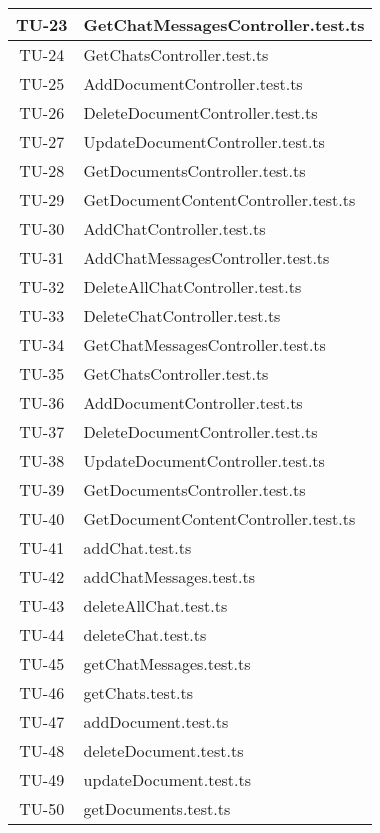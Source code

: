 \begin{xltabular}{0.7\textwidth}{| c | X |}
    TU-23 & GetChatMessagesController.test.ts \\
    \hline
    TU-24 & GetChatsController.test.ts \\
    \hline
    TU-25 & AddDocumentController.test.ts \\
    \hline
    TU-26 & DeleteDocumentController.test.ts \\
    \hline
    TU-27 & UpdateDocumentController.test.ts \\
    \hline
    TU-28 & GetDocumentsController.test.ts \\
    \hline
    TU-29 & GetDocumentContentController.test.ts \\
    \hline
    TU-30 & AddChatController.test.ts \\
    \hline
    TU-31 & AddChatMessagesController.test.ts \\
    \hline
    TU-32 & DeleteAllChatController.test.ts \\
    \hline
    TU-33 & DeleteChatController.test.ts \\
    \hline
    TU-34 & GetChatMessagesController.test.ts \\
    \hline
    TU-35 & GetChatsController.test.ts \\
    \hline
    TU-36 & AddDocumentController.test.ts \\
    \hline
    TU-37 & DeleteDocumentController.test.ts \\
    \hline
    TU-38 & UpdateDocumentController.test.ts \\
    \hline
    TU-39 & GetDocumentsController.test.ts \\
    \hline
    TU-40 & GetDocumentContentController.test.ts \\
    \hline
    TU-41 & addChat.test.ts \\
    \hline
    TU-42 & addChatMessages.test.ts \\
    \hline
    TU-43 & deleteAllChat.test.ts \\
    \hline
    TU-44 & deleteChat.test.ts \\
    \hline
    TU-45 & getChatMessages.test.ts \\
    \hline
    TU-46 & getChats.test.ts \\
    \hline
    TU-47 & addDocument.test.ts \\
    \hline
    TU-48 & deleteDocument.test.ts \\
    \hline
    TU-49 & updateDocument.test.ts \\
    \hline
    TU-50 & getDocuments.test.ts \\

\end{xltabular}

